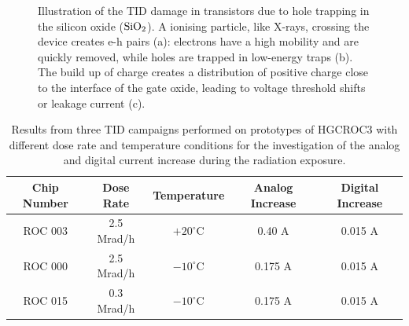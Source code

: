 \begin{figure}
    \centering
    \caption{Illustration of the TID damage in transistors due to hole trapping in the silicon oxide ($\textnormal{SiO}_2$). A ionising particle, like X-rays, crossing the device creates e-h pairs (a): electrons have a high mobility and are quickly removed, while holes are trapped in low-energy traps (b). The build up of charge creates a distribution of positive charge close to the interface of the gate oxide, leading to voltage threshold shifts or leakage current (c).}
    \label{fig:TID_Transistors}
\end{figure}

\begin{table}
    \centering
    \begin{tabular}{c|c|c|c|c}
        \hline
        \hline
        Chip Number & Dose Rate & Temperature & Analog Increase & Digital Increase \\
        \hline
        ROC 003 & 2.5 Mrad/h & $+20^{\circ}$C & 0.40 A & 0.015 A \\
        ROC 000 & 2.5 Mrad/h & $-10^{\circ}$C & 0.175 A & 0.015 A \\
        ROC 015 & 0.3 Mrad/h & $-10^{\circ}$C & 0.175 A & 0.015 A \\
        \hline
        \hline
    \end{tabular}
    \caption{Results from three TID campaigns performed on prototypes of HGCROC3 with different dose rate and temperature conditions for the investigation of the analog and digital current increase during the radiation exposure.}
    \label{tab:TID_Current}
\end{table}

